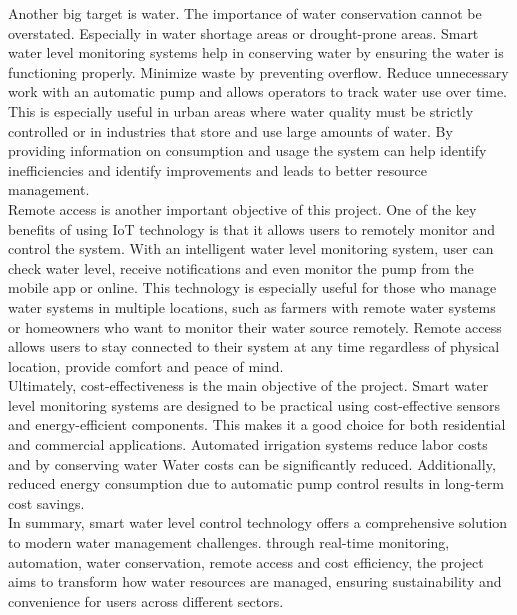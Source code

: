 {\noindent 
Another big target is water. The importance of water conservation cannot be overstated. Especially in water shortage areas or drought-prone areas. Smart water level monitoring systems help in conserving water by ensuring the water is functioning properly. Minimize waste by preventing overflow. Reduce unnecessary work with an automatic pump and allows operators to track water use over time. This is especially useful in urban areas where water quality must be strictly controlled or in industries that store and use large amounts of water. By providing information on consumption and usage the system can help identify inefficiencies and identify improvements and leads to better resource management. \\

\noindent
Remote access is another important objective of this project. One of the key benefits of using IoT technology is that it allows users to remotely monitor and control the system. With an intelligent water level monitoring system, user can check water level, receive notifications and even monitor the pump from the mobile app or online. This technology is especially useful for those who manage water systems in multiple locations, such as farmers with remote water systems or homeowners who want to monitor their water source remotely. Remote access allows users to stay connected to their system at any time regardless of physical location, provide comfort and peace of mind.\\

\noindent
Ultimately, cost-effectiveness is the main objective of the project. Smart water level monitoring systems are designed to be practical using cost-effective sensors and energy-efficient components. This makes it a good choice for both residential and commercial applications. Automated irrigation systems reduce labor costs and by conserving water Water costs can be significantly reduced. Additionally, reduced energy consumption due to automatic pump control results in long-term cost savings.\\

\noindent
 In summary, smart water level control technology offers a comprehensive solution to modern water management challenges. through real-time monitoring, automation, water conservation, remote access and cost efficiency, the project aims to transform how water resources are managed, ensuring sustainability and convenience for users across different sectors.
}
